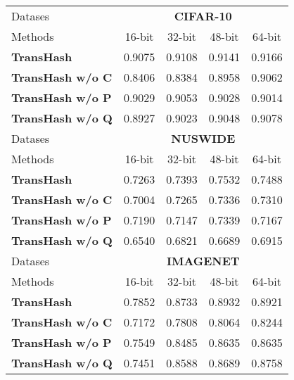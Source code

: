 \begin{table}[!htpb]
    \centering
    \begin{tabular}{cccccc}
       \\ \hline
    \multicolumn{2}{l|}{Datases} & \multicolumn{4}{c}{\textbf{CIFAR-10}} \\
    \multicolumn{2}{l|}{Methods} & 16-bit & 32-bit & 48-bit & 64-bit   \\\hline
    \hline
    \multicolumn{2}{l|}{\textbf{TransHash}} & 0.9075 & 0.9108 & 0.9141 & 0.9166  \\
    \multicolumn{2}{l|}{\textbf{TransHash w/o C}} & 0.8406 & 0.8384 & 0.8958 & 0.9062  \\
    \multicolumn{2}{l|}{\textbf{TransHash w/o P}} & 0.9029 & 0.9053 & 0.9028 & 0.9014  \\
    \multicolumn{2}{l|}{\textbf{TransHash w/o Q}} & 0.8927 & 0.9023 & 0.9048 & 0.9078  \\
    \hline
    \hline 
    \multicolumn{2}{l|}{Datases} & \multicolumn{4}{c}{\textbf{NUSWIDE}} \\
    \multicolumn{2}{l|}{Methods} & 16-bit & 32-bit & 48-bit & 64-bit   \\\hline
    \hline
    \multicolumn{2}{l|}{\textbf{TransHash}} & 0.7263 & 0.7393 & 0.7532 & 0.7488  \\
    \multicolumn{2}{l|}{\textbf{TransHash w/o C}} & 0.7004 & 0.7265 & 0.7336 & 0.7310  \\
    \multicolumn{2}{l|}{\textbf{TransHash w/o P}} & 0.7190 & 0.7147 & 0.7339 & 0.7167  \\
    \multicolumn{2}{l|}{\textbf{TransHash w/o Q}} & 0.6540 & 0.6821 & 0.6689 & 0.6915  \\
    \hline
    \hline 
    \multicolumn{2}{l|}{Datases} & \multicolumn{4}{c}{\textbf{IMAGENET}} \\
    \multicolumn{2}{l|}{Methods} & 16-bit & 32-bit & 48-bit & 64-bit   \\\hline
    \hline
    \multicolumn{2}{l|}{\textbf{TransHash}} & 0.7852 & 0.8733 & 0.8932 & 0.8921  \\
    \multicolumn{2}{l|}{\textbf{TransHash w/o C}} & 0.7172 & 0.7808 & 0.8064 & 0.8244  \\
    \multicolumn{2}{l|}{\textbf{TransHash w/o P}} & 0.7549 & 0.8485 & 0.8635 & 0.8635  \\
    \multicolumn{2}{l|}{\textbf{TransHash w/o Q}} & 0.7451 & 0.8588 & 0.8689 & 0.8758  \\
    \hline
    \hline 
    \end{tabular}
    \label{table:ablation}
  \end{table}






